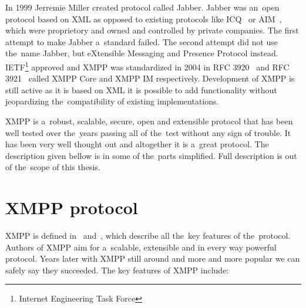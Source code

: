 In 1999 Jerremie Miller created protocol called Jabber. Jabber was an~open protocol based on XML as opposed to existing protocols like ICQ~\cite{ICQ} or AIM~\cite{AIM}, which were proprietory and owned and controlled by private companies. The first attempt to make Jabber a~standard failed. The second attempt did not use the~name Jabber, but eXtensible Messaging and Presence Protocol instead. IETF\footnote{Internet Engineering Task Force} approved and XMPP was standardized in 2004 in RFC 3920~\cite{xmppCoreRFC} and RFC 3921~\cite{xmppIMRFC} called XMPP Core and XMPP IM respectively. Development of XMPP is still active as it is based on XML it is possible to add functionality without jeopardizing the~compatibility of existing implementations.      

XMPP is a~robust, scalable, secure, open and extensible protocol that has been well tested over the~years passing all of the~test without any sign of trouble. It has been very well thought out and altogether it is a~great protocol. The description given bellow is in some of the~parts simplified. Full description is out of the~scope of this thesis.   

\section{XMPP protocol}
XMPP is defined in~\cite{xmppCoreRFC} and~\cite{xmppIMRFC}, which describe all the~key features of the~protocol. Authors of XMPP aim for a~scalable, extensible and in every way powerful protocol. Years later with XMPP still around and more and more popular we can safely say they succeeded. The key features of XMPP include:

